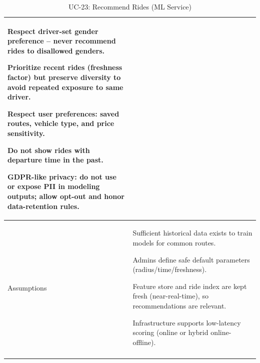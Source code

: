 \begin{longtable}{|p{3.5cm}|p{12cm}|}
Respect driver-set gender preference – never recommend rides to disallowed genders.

Prioritize recent rides (freshness factor) but preserve diversity to avoid repeated exposure to same driver.

Respect user preferences: saved routes, vehicle type, and price sensitivity.

Do not show rides with departure time in the past.

GDPR-like privacy: do not use or expose PII in modeling outputs; allow opt-out and honor data-retention rules. \\
\hline
Assumptions &
Sufficient historical data exists to train models for common routes.

Admins define safe default parameters (radius/time/freshness).

Feature store and ride index are kept fresh (near-real-time), so recommendations are relevant.

Infrastructure supports low-latency scoring (online or hybrid online-offline). \\
\hline
\caption{UC-23: Recommend Rides (ML Service)}
\end{longtable}

